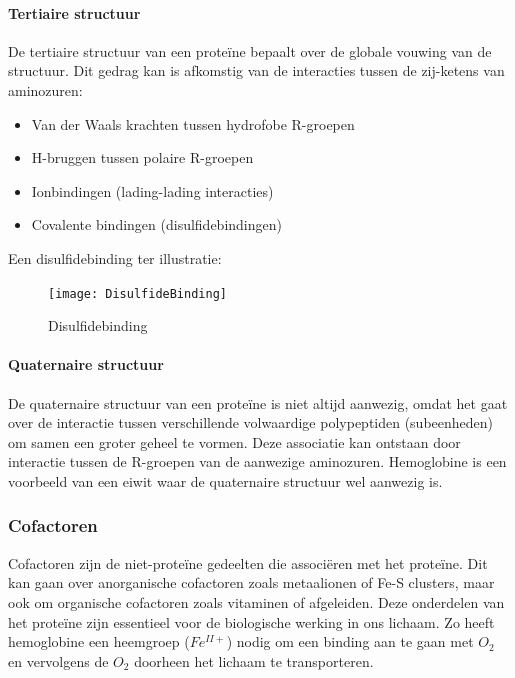 \documentclass[a4paper,kul]{kulakarticle} %
\begin{document}
\paragraph{Tertiaire structuur}
De tertiaire structuur van een proteïne bepaalt over de globale vouwing van de structuur. Dit gedrag kan is afkomstig van de interacties tussen de zij-ketens van aminozuren:
\begin{itemize}
	\item Van der Waals krachten tussen hydrofobe R-groepen
	\item H-bruggen tussen polaire R-groepen
	\item Ionbindingen (lading-lading interacties)
	\item Covalente bindingen (disulfidebindingen)
\end{itemize}
Een disulfidebinding ter illustratie:
\begin{figure}[h]
	\centering
	\texttt{[image: DisulfideBinding]}
	\caption[Disulfidebinding]{Disulfidebinding}
	\label{fig:disulfidebinding}
\end{figure}
\paragraph{Quaternaire structuur}
De quaternaire structuur van een proteïne is niet altijd aanwezig, omdat het gaat over de interactie tussen verschillende volwaardige polypeptiden (subeenheden) om samen een groter geheel te vormen. Deze associatie kan ontstaan door interactie tussen de R-groepen van de aanwezige aminozuren. Hemoglobine is een voorbeeld van een eiwit waar de quaternaire structuur wel aanwezig is.
\subsubsection{Cofactoren} 
Cofactoren zijn de niet-proteïne gedeelten die associëren met het proteïne. Dit kan gaan over anorganische cofactoren zoals metaalionen of Fe-S clusters, maar ook om organische cofactoren zoals vitaminen of afgeleiden. Deze onderdelen van het proteïne zijn essentieel voor de biologische werking in ons lichaam. Zo heeft hemoglobine een heemgroep ($Fe^{II+}$) nodig om een binding aan te gaan met $O_2$ en vervolgens de $O_2$ doorheen het lichaam te transporteren. 
\end{document}
